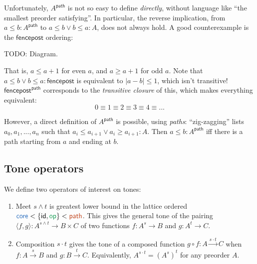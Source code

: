 \documentclass{article}
\newcommand{\todo}[1]{{\color{red}#1}}
\newcommand{\ms}[1]{\ensuremath{\mathsf{#1}}}
\newcommand{\op}{\ms{op}}
\newcommand{\iso}{\ms{core}}
\renewcommand{\path}{\ms{path}}
\newcommand{\tm}{{\ms{id}}}     %
\newcommand{\ta}{{\color{ForestGreen}\ensuremath{\op}}}    %
\newcommand{\ti}{{\color{NavyBlue}\ensuremath{\iso}}} %
\newcommand{\tb}{{\color{Bittersweet}\ensuremath{\path}}}  %
\newcommand{\tc}{\cdot}         %
\begin{document}
Unfortunately, $A^\path$ is not so easy to define \emph{directly}, without
language like ``the smallest preorder satisfying''.
%
In particular, the reverse implication, from $a \le b : A^\path$ to $a \le b
\vee b \le a : A$, does not always hold. A good counterexample is the
\ms{fencepost} ordering:

\todo{TODO: Diagram}.

That is, $a \le a+1$ for even $a$, and $a \ge a+1$ for odd $a$. Note that $a \le
b \vee b \le a : \ms{fencepost}$ is equivalent to $|a-b| \le 1$, which isn't
transitive! $\ms{fencepost}^\path$ corresponds to the \emph{transitive closure}
of this, which makes everything equivalent:
\[ 0 \equiv 1 \equiv 2 \equiv 3 \equiv 4 \equiv ... \]

However, a direct definition of $A^\path$ is possible, using \emph{paths}:
``zig-zagging'' lists $a_0, a_1, ..., a_n$ such that $a_i \le a_{i+1} \vee a_i
\ge a_{i+1} : A$. Then $a \le b : A^\path$ iff there is a path starting from $a$
and ending at $b$.


\subsection{Tone operators}

We define two operators of interest on tones:
\begin{enumerate}
\item Meet $s \wedge t$ is greatest lower bound in the lattice ordered $\ti <
  \{\tm, \ta\} < \tb$. This gives the general tone of the pairing $\langle f,
  g\rangle : A^{s \wedge t} \to B \times C$ of two functions $f : A^s \to B$ and
  $g : A^{t} \to C$.

\item Composition $s \tc t$ gives the tone of a composed function $g \circ f : A
  \overset{s\tc t}{\to} C$ when $f : A \overset{s}{\to} B$ and $g : B
  \overset{t}{\to} C$. Equivalently, $A^{s\tc t} = (A^s)^t$ for any preorder
  $A$.
\end{enumerate}
\end{document}
